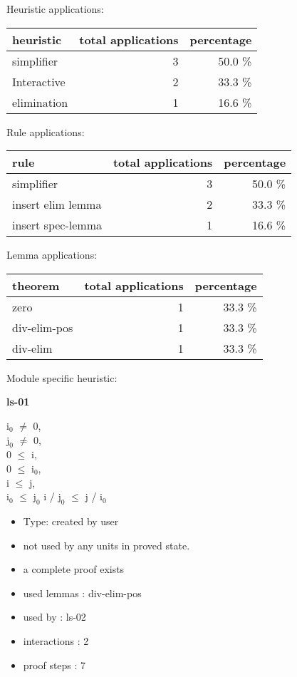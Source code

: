 \documentclass[a4paper]{article}
\begin{document}
\medskip


Heuristic applications:

\begin{supertabular}{l|r|r}
heuristic	& total applications & percentage \\ \hline
simplifier & 3 & 50.0 \% \\
Interactive & 2 & 33.3 \% \\
elimination & 1 & 16.6 \% \\

\end{supertabular}

Rule applications:

\begin{supertabular}{l|r|r}
rule	        & total applications & percentage \\ \hline
simplifier & 3 & 50.0 \% \\
insert elim lemma & 2 & 33.3 \% \\
insert spec-lemma & 1 & 16.6 \% \\

\end{supertabular}

Lemma applications:

\begin{supertabular}{l|r|r}
theorem	        & total applications & percentage \\ \hline
zero & 1 & 33.3 \% \\
div-elim-pos & 1 & 33.3 \% \\
div-elim & 1 & 33.3 \% \\

\end{supertabular}

Module specific heuristic:

\pagebreak

{\LARGE\bf ls-01}\label{lemma-ls-01}

\medskip

$\mbox{i}_{0}$ $\neq$ 0, \\
$\mbox{j}_{0}$ $\neq$ 0, \\
0 $\le$ i, \\
0 $\le$ $\mbox{i}_{0}$, \\
i $\le$ j, \\
$\mbox{i}_{0}$ $\le$ $\mbox{j}_{0}$ \Fol i / $\mbox{j}_{0}$ $\le$ j / $\mbox{i}_{0}$

\begin{itemize}

\item Type: created by user

\item not used by any units in proved state.
\item       a complete proof exists
\item       used lemmas  : div-elim-pos
\item       used by      : ls-02
\item       interactions : 2
\item       proof steps  : 7
\end{itemize}
\end{document}
